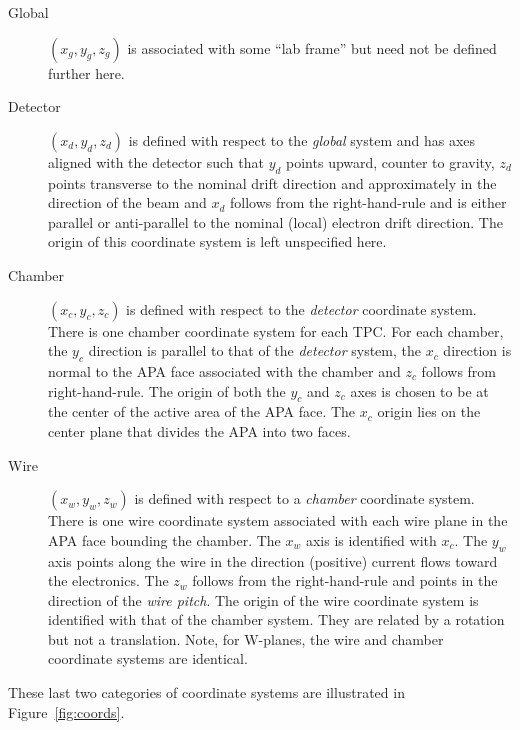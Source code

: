\documentclass[pdftex,12pt,letter]{article}
\begin{document}
\begin{description}
\item[Global] $(x_g, y_g, z_g)$ is associated with
  some ``lab frame'' but need not be defined further here.
\item[Detector] $(x_d, y_d, z_d)$ is defined with respect to the
  \textit{global} system and has axes aligned with the detector such
  that $y_d$ points upward, counter to gravity, $z_d$ points
  transverse to the nominal drift direction and approximately in the
  direction of the beam and $x_d$ follows from the right-hand-rule and
  is either parallel or anti-parallel to the nominal (local) electron
  drift direction.  The origin of this coordinate system is left
  unspecified here.
\item[Chamber] $(x_c, y_c, z_c)$ is defined with respect to the
  \textit{detector} coordinate system.  There is one chamber
  coordinate system for each TPC.  For each chamber, the $y_c$
  direction is parallel to that of the \textit{detector} system, the
  $x_c$ direction is normal to the APA face associated with the
  chamber and $z_c$ follows from right-hand-rule.  The origin of both
  the $y_c$ and $z_c$ axes is chosen to be at the center of the active
  area of the APA face.  The $x_c$ origin lies on the center plane
  that divides the APA into two faces.
\item[Wire] $(x_w, y_w, z_w)$ is defined with respect to a
  \textit{chamber} coordinate system.  There is one wire coordinate
  system associated with each wire plane in the APA face bounding the
  chamber.  The $x_w$ axis is identified with $x_c$.  The $y_w$ axis
  points along the wire in the direction (positive) current flows
  toward the electronics.  The $z_w$ follows from the right-hand-rule
  and points in the direction of the \textit{wire pitch}.  The origin
  of the wire coordinate system is identified with that of the chamber
  system.  They are related by a rotation but not a
  translation.  Note, for W-planes, the wire and chamber coordinate
  systems are identical.
\end{description}

\noindent These last two categories of coordinate systems are illustrated in Figure~\ref{fig:coords}.
\end{document}
